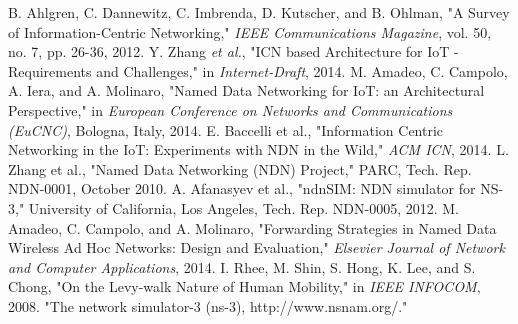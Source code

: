 \documentclass[conference]{IEEEtran}
\begin{document}
\begin{thebibliography}{00}
 B. Ahlgren, C. Dannewitz, C. Imbrenda, D. Kutscher, and B. Ohlman, "A Survey of Information-Centric Networking," \textit{IEEE Communications Magazine}, vol. 50, no. 7, pp. 26-36, 2012.
 Y. Zhang \textit{et al.}, "ICN based Architecture for IoT - Requirements and Challenges," in \textit{Internet-Draft}, 2014.
 M. Amadeo, C. Campolo, A. Iera, and A. Molinaro, "Named Data Networking for IoT: an Architectural Perspective," in \textit{European Conference on Networks and Communications (EuCNC)}, Bologna, Italy, 2014.
 E. Baccelli et al., "Information Centric Networking in the IoT: Experiments with NDN in the Wild," \textit{ACM ICN}, 2014.
 L. Zhang et al., "Named Data Networking (NDN) Project," PARC, Tech. Rep. NDN-0001, October 2010.
 A. Afanasyev et al., "ndnSIM: NDN simulator for NS-3," University of California, Los Angeles, Tech. Rep. NDN-0005, 2012.
 M. Amadeo, C. Campolo, and A. Molinaro, "Forwarding Strategies in Named Data Wireless Ad Hoc Networks: Design and Evaluation," \textit{Elsevier Journal of Network and Computer Applications}, 2014.
 I. Rhee, M. Shin, S. Hong, K. Lee, and S. Chong, "On the Levy-walk Nature of Human Mobility," in \textit{IEEE INFOCOM}, 2008.
 "The network simulator-3 (ns-3), http://www.nsnam.org/."
\end{thebibliography}
\vspace{12pt}
\color{red}
\end{document}
